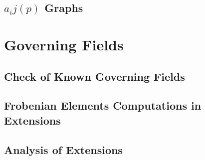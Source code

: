 \subsection{$a_ij(p)$ Graphs}




\section{Governing Fields}
\subsection{Check of Known Governing Fields}
\subsection{Frobenian Elements Computations in Extensions}
\subsection{Analysis of Extensions}


